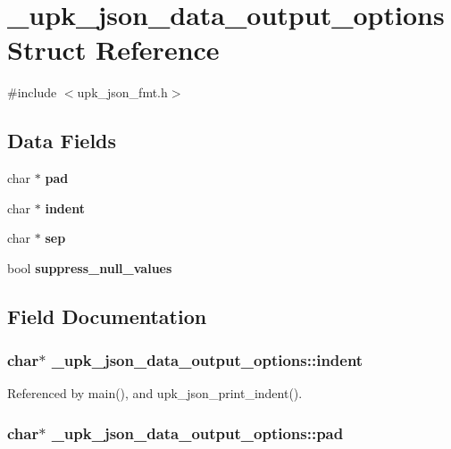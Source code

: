 \section{\_\-upk\_\-json\_\-data\_\-output\_\-options Struct Reference}
\label{struct__upk__json__data__output__options}


{\ttfamily \#include $<$upk\_\-json\_\-fmt.h$>$}

\subsection*{Data Fields}
\begin{DoxyCompactItemize}
\item 
char $\ast$ {\bf pad}
\item 
char $\ast$ {\bf indent}
\item 
char $\ast$ {\bf sep}
\item 
bool {\bf suppress\_\-null\_\-values}
\end{DoxyCompactItemize}


\subsection{Field Documentation}
\subsubsection[{indent}]{\setlength{\rightskip}{0pt plus 5cm}char$\ast$ {\bf \_\-upk\_\-json\_\-data\_\-output\_\-options::indent}}\label{struct__upk__json__data__output__options_a9fbe574e6f8f2e5558c3457d30793233}


Referenced by main(), and upk\_\-json\_\-print\_\-indent().

\subsubsection[{pad}]{\setlength{\rightskip}{0pt plus 5cm}char$\ast$ {\bf \_\-upk\_\-json\_\-data\_\-output\_\-options::pad}}\label{struct__upk__json__data__output__options_a0527cd1bc302b79fe542ac8cb081f725}


